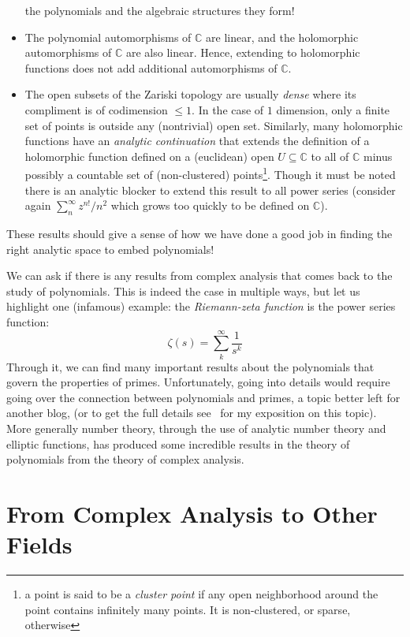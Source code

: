 \documentclass[oneside]{article}
\newcommand{\C}{\mathbb{C}}
\newcommand{\sse}{\subseteq}
\begin{document}
\begin{itemize}
      the polynomials and the algebraic structures they form!
  \item The polynomial automorphisms of $\C$ are linear, and the holomorphic automorphisms of $\C$ are also
    linear. Hence, extending to holomorphic functions does not add additional automorphisms of $\C$.
  \item The open subsets of the Zariski topology are usually \emph{dense} where its compliment is of
    codimension $\le 1$. In the case of $1$ dimension, only a finite set of points is outside any
    (nontrivial) open set. Similarly, many holomorphic functions have an \emph{analytic continuation} that
    extends the definition of a holomorphic function defined on a (euclidean) open $U \sse \C$ to all of $\C$ minus possibly a
    countable set of (non-clustered) points\footnote{a point is said to be a \emph{cluster point} if any
      open neighborhood around the point contains infinitely many points. It is non-clustered, or sparse,
    otherwise}. Though it must be noted there is an analytic blocker to extend this result to all power series
    (consider again $\sum_n^\infty z^{n!}/n^2$ which grows too quickly to be defined on $\C$).
\end{itemize}

These results should give a sense of how we have done a good job in finding the right analytic space to
embed polynomials!

We can ask if there is any results from complex analysis that comes back to the
study of polynomials. This is indeed the case in multiple ways, but let us highlight one (infamous) example: the
\emph{Riemann-zeta function} is the power series function:
\[
  \zeta(s) = \sum_k^\infty \frac{1}{s^k}
\]
Through it, we can find many important results about the polynomials that govern the properties of primes.
Unfortunately, going into details would require going over the connection between polynomials and primes,
a topic better left for another blog, (or to get the full details
see~\cite[chapter~3]{nathanaelchwojko-srawleyEverythingYouNeed} for my exposition on this topic). More
generally number theory, through the use of analytic number theory and elliptic functions, has produced some
incredible results in the theory of polynomials from the theory of complex analysis.



\section{From Complex Analysis to Other Fields}
\end{document}
